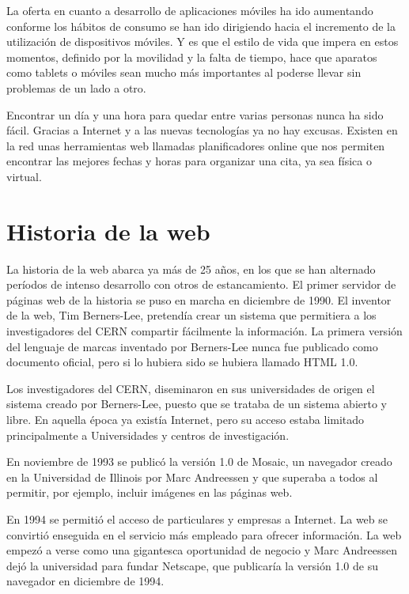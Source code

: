 \documentclass[a4paper, 12pt]{book}
\begin{document}
La oferta en cuanto a desarrollo de aplicaciones m\'oviles ha ido aumentando conforme los h\'abitos de consumo se han ido dirigiendo hacia el incremento de la utilizaci\'on de dispositivos m\'oviles. Y es que el estilo de vida que impera en estos momentos, definido por la movilidad y la falta de tiempo, hace que aparatos como tablets o m\'oviles sean mucho m\'as importantes al poderse llevar sin problemas de un lado a otro.

Encontrar un d\'ia y una hora para quedar entre varias personas nunca ha sido f\'acil. Gracias a Internet y a las nuevas tecnolog\'ias ya no hay excusas. Existen en la red unas herramientas web llamadas planificadores online que nos permiten encontrar las mejores fechas y horas para organizar una cita, ya sea f\'isica o virtual.

\section{Historia de la web}
\label{sec:seccion}

La historia de la web abarca ya m\'as de 25 a\~nos, en los que se han alternado per\'iodos de intenso desarrollo con otros de estancamiento. El primer servidor de p\'aginas web de la historia se puso en marcha en diciembre de 1990. El inventor de la web, Tim Berners-Lee, pretend\'ia crear un sistema que permitiera a los investigadores del CERN compartir f\'acilmente la informaci\'on. La primera versi\'on del lenguaje de marcas inventado por Berners-Lee nunca fue publicado como documento oficial, pero si lo hubiera sido se hubiera llamado HTML 1.0.

Los investigadores del CERN,  diseminaron en sus universidades de origen el sistema creado por Berners-Lee, puesto que se trataba de un sistema abierto y libre. En aquella \'epoca ya exist\'ia Internet, pero su acceso estaba limitado principalmente a Universidades y centros de investigaci\'on.

En noviembre de 1993 se public\'o la versi\'on 1.0 de Mosaic, un navegador creado en la Universidad de Illinois por Marc Andreessen y que superaba a todos al permitir, por ejemplo, incluir im\'agenes en las p\'aginas web.

En 1994 se permiti\'o el acceso de particulares y empresas a Internet. La web se convirti\'o enseguida en el servicio m\'as empleado para ofrecer informaci\'on. La web empez\'o a verse como una gigantesca oportunidad de negocio y Marc Andreessen dej\'o la universidad para fundar Netscape, que publicar\'ia la versi\'on 1.0 de su navegador en diciembre de 1994.
\end{document}
